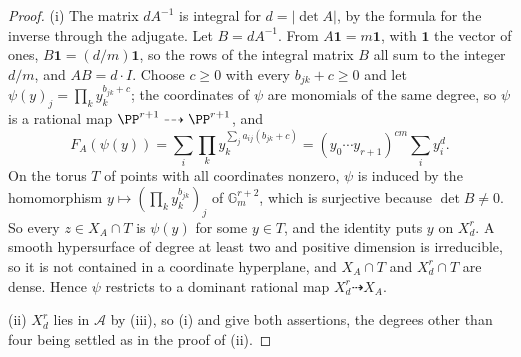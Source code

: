 \begin{proof}
(i) The matrix $dA^{-1}$ is integral for $d=|\det A|$, by the formula
for the inverse through the adjugate. Let $B=dA^{-1}$. From
$A\mathbf{1}=m\mathbf{1}$, with $\mathbf{1}$ the vector of ones,
$B\mathbf{1}=(d/m)\mathbf{1}$, so the rows of the integral matrix $B$ all
sum to the integer $d/m$, and $AB=d\cdot I$. Choose $c\ge0$
with every $b_{jk}+c\ge0$ and let $\psi(y)_{j}=\prod_{k}y_{k}^{b_{jk}+c}$;
the coordinates of $\psi$ are monomials of the same degree, so $\psi$ is a
rational map $\PP^{r+1}\dashrightarrow\PP^{r+1}$, and
\[
  F_{A}(\psi(y))=\sum_{i}\prod_{k}y_{k}^{\sum_{j}a_{ij}(b_{jk}+c)}
  =(y_{0}\cdots y_{r+1})^{cm}\sum_{i}y_{i}^{d}.
\]
On the torus $T$ of points with all coordinates nonzero, $\psi$ is induced
by the homomorphism $y\mapsto(\prod_{k}y_{k}^{b_{jk}})_{j}$ of
$\mathbb{G}_{m}^{r+2}$, which is surjective because $\det B\ne0$. So every
$z\in X_{A}\cap T$ is $\psi(y)$ for some $y\in T$, and the identity puts $y$
on $X^{r}_{d}$. A smooth hypersurface of degree at least two and positive
dimension is irreducible, so it is not contained in a coordinate hyperplane,
and $X_{A}\cap T$ and $X^{r}_{d}\cap T$ are dense. Hence $\psi$ restricts to
a dominant rational map $X^{r}_{d}\dashrightarrow X_{A}$.

(ii) $X^{r}_{d}$ lies in $\mathcal{A}$ by (iii), so (i)
and  give both assertions, the degrees other than
four being settled as in the proof of (ii).


\end{proof}
